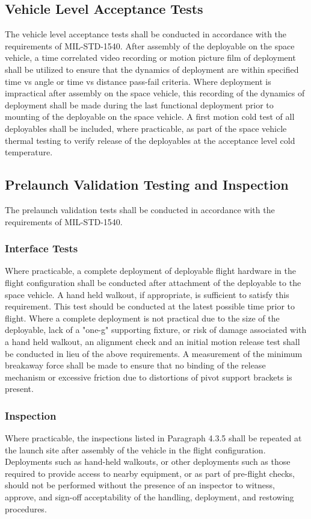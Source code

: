 \documentclass[12pt]{article}
\begin{document}
\subsection{Vehicle Level Acceptance Tests} %
The vehicle level acceptance tests shall be conducted in accordance with the requirements of MIL-STD-1540. 
After assembly of the deployable on the space vehicle, a time correlated video recording or motion picture film of deployment shall be utilized to ensure that the dynamics of deployment are within specified time vs angle or time vs distance pass-fail criteria. 
Where deployment is impractical after assembly on the space vehicle, this recording of the dynamics of deployment shall be made during the last functional deployment prior to mounting of the deployable on the space vehicle. 
A first motion cold test of all deployables shall be included, where practicable, as part of the space vehicle thermal testing to verify release of the deployables at the acceptance level cold temperature.

\subsection{Prelaunch Validation Testing and Inspection} %
The prelaunch validation tests shall be conducted in accordance with the requirements of MIL-STD-1540.

\subsubsection{Interface Tests} %
Where practicable, a complete deployment of deployable flight hardware in the flight configuration shall be conducted after attachment of the deployable to the space vehicle. 
A hand held walkout, if appropriate, is sufficient to satisfy this requirement. 
This test should be conducted at the latest possible time prior to flight. 
Where a complete deployment is not practical due to the size of the deployable, lack of a "one-g" supporting fixture, or risk of damage associated with a hand held walkout, an alignment check and an initial motion release test shall be conducted in lieu of the above requirements. 
A measurement of the minimum breakaway force shall be made to ensure that no binding of the release mechanism or excessive friction due to distortions of pivot support brackets is present.

\subsubsection{Inspection} %
Where practicable, the inspections listed in Paragraph 4.3.5 shall be repeated at the launch site after assembly of the vehicle in the flight configuration.
Deployments such as hand-held walkouts, or other deployments such as those required to provide access to nearby equipment, or as part of pre-flight checks, should not be performed without the presence of an inspector to witness, approve, and sign-off acceptability of the handling, deployment, and restowing procedures.
\end{document}
